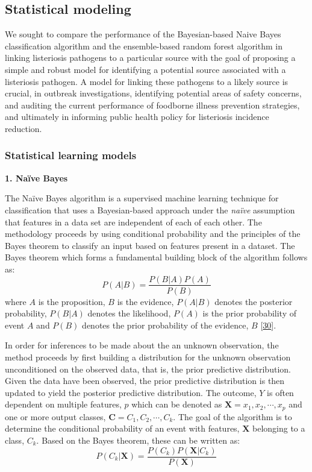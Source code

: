 \documentclass[
  10pt,
]{article}
\begin{document}
\hypertarget{statistical-modeling}{%
\subsection{Statistical modeling}\label{statistical-modeling}}

We sought to compare the performance of the Bayesian-based Naive Bayes classification algorithm and the ensemble-based random forest algorithm in linking listeriosis pathogens to a particular source with the goal of proposing a simple and robust model for identifying a potential source associated with a listeriosis pathogen. A model for linking these pathogens to a likely source is crucial, in outbreak investigations, identifying potential areas of safety concerns, and auditing the current performance of foodborne illness prevention strategies, and ultimately in informing public health policy for listeriosis incidence reduction.

\hypertarget{statistical-learning-models}{%
\subsubsection{Statistical learning models}\label{statistical-learning-models}}

\textbf{1. Naïve Bayes}

The Naïve Bayes algorithm is a supervised machine learning technique for classification that uses a Bayesian-based approach under the \emph{naïve} assumption that features in a data set are independent of each of each other. The methodology proceeds by using conditional probability and the principles of the Bayes theorem to classify an input based on features present in a dataset. The Bayes theorem which forms a fundamental building block of the algorithm follows as:
\begin{equation}
    P(A|B) = \frac{P(B|A)P(A)}{P(B)}
\end{equation}
where \(A\) is the proposition, \(B\) is the evidence, \(P(A|B)\) denotes the posterior probability, \(P(B|A)\) denotes the likelihood, \(P(A)\) is the prior probability of event \(A\) and \(P(B)\) denotes the prior probability of the evidence, \(B\) {[}\protect\hyperlink{ref-gelman1995bayesian}{30}{]}.

In order for inferences to be made about the an unknown observation, the method proceeds by first building a distribution for the unknown observation unconditioned on the observed data, that is, the prior predictive distribution. Given the data have been observed, the prior predictive distribution is then updated to yield the posterior predictive distribution. The outcome, \(Y\) is often dependent on multiple features, \(p\) which can be denoted as \(\mathbf{X} = x_1, x_2, \cdots, x_p\) and one or more output classes, \(\mathbf{C} = C_1, C_2, \cdots, C_k\). The goal of the algorithm is to determine the conditional probability of an event with features, \(\mathbf{X}\) belonging to a class, \(C_k\). Based on the Bayes theorem, these can be written as:
\begin{equation}
    P(C_k|\mathbf{X}) = \frac{P(C_k)P(\mathbf{X}|C_k)}{P(\mathbf{X})}
\end{equation}
\end{document}
